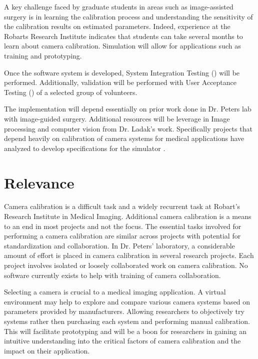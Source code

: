 \documentclass[11pt]{report}
\begin{document}
A key challenge faced by graduate students in areas such as image-assisted surgery is in learning the calibration process and understanding the sensitivity of the calibration results on estimated parameters. Indeed, experience at the Robarts Research Institute indicates that students can take several months to learn about camera calibration. Simulation will allow for applications such as training and prototyping. 



Once the software system is developed, System Integration Testing () will be performed. Additionally, validation will be performed with User Acceptance Testing () of a selected group of volunteers. 

The implementation will depend essentially on prior work done in Dr. Peters lab with image-guided surgery. Additional resources will be leverage in Image processing and computer vision from Dr. Ladak's work. Specifically projects that depend heavily on calibration of camera systems for medical applications have analyzed to develop specifications for the simulator \cite{CC}. 
 

\section{Relevance}

Camera calibration is a difficult task and a widely recurrent task at Robart's Research Institute in Medical Imaging. Additional camera calibration is a means to an end in most projects and not the focus. The essential tasks involved for performing a camera calibration are similar across projects with potential for standardization and collaboration. In Dr. Peters' laboratory, a considerable amount of effort is placed in camera calibration in several research projects. Each project involves isolated or loosely collaborated work on camera calibration. No software currently exists to help with training of camera collaboration. 

Selecting a camera is crucial to a medical imaging application. A virtual environment may help to explore and compare various camera systems based on parameters provided by manufacturers. Allowing researchers to objectively try systems rather then purchasing each system and performing manual calibration. This will facilitate prototyping and will be a boon for researchers in  gaining an intuitive understanding into the critical factors of camera calibration and the impact on their application. 
\end{document}
